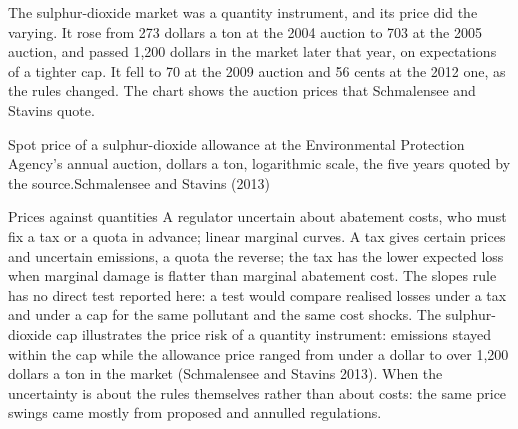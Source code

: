 The sulphur-dioxide market was a quantity instrument, and its price did the varying. It rose from 273 dollars a ton at the
2004 auction to 703 at the 2005 auction, and passed 1{,}200 dollars in the market later that year, on expectations of a
tighter cap. It fell to 70 at the 2009 auction and 56 cents at the 2012 one, as
the rules changed. The chart shows the auction prices that Schmalensee and Stavins quote.

\begin{omchart}{Spot price of a sulphur-dioxide allowance at the Environmental Protection Agency's annual auction, dollars a
  ton, logarithmic scale, the five years quoted by the source.}{Schmalensee and Stavins (2013)}
\end{omchart}

\begin{model}{Prices against quantities}
\assumes A regulator uncertain about abatement costs, who must fix a tax or a quota in advance; linear marginal curves.
\predicts A tax gives certain prices and uncertain emissions, a quota the reverse; the tax has the lower expected loss when
marginal damage is flatter than marginal abatement cost.
\tested The slopes rule has no direct test reported here: a test would compare realised losses under a tax and under a
cap for the same pollutant and the same cost shocks. The sulphur-dioxide cap illustrates the price risk of a quantity
instrument: emissions stayed within the cap while the allowance price ranged from under a dollar to over 1{,}200 dollars
a ton in the market (Schmalensee and Stavins 2013).
\breaks When the uncertainty is about the rules themselves rather than about costs: the same price swings came mostly from
proposed and annulled regulations.
\end{model}

